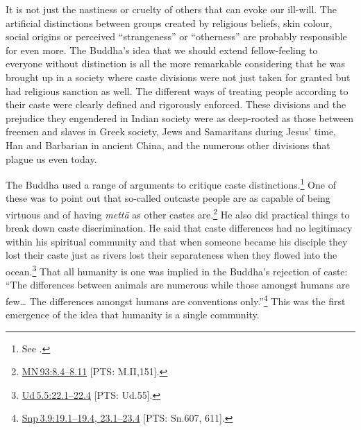 \documentclass[10pt, openright]{book}
\begin{document}
It is not just the nastiness or cruelty of others that can evoke our ill-will. The artificial distinctions between groups created by religious beliefs, skin colour, social origins or perceived “strangeness” or “otherness” are probably responsible for even more. The Buddha’s idea that we should extend fellow-feeling to everyone without distinction is all the more remarkable considering that he was brought up in a society where caste divisions were not just taken for granted but had religious sanction as well. The different ways of treating people according to their caste were clearly defined and rigorously enforced. These divisions and the prejudice they engendered in Indian society were as deep-rooted as those between freemen and slaves in Greek society, Jews and Samaritans during Jesus’ time, Han and Barbarian in ancient China, and the numerous other divisions that plague us even today.


The Buddha used a range of arguments to critique caste distinctions.\footnote {See \cite{Malalasekera and Jayatilleke 1974}.} One of these was to point out that so-called outcaste people are as capable of being virtuous and of having \textit{mettā} as other castes are.\footnote {\href{https://suttacentral.net/mn93/en/sujato\#8.4}{MN 93:8.4–8.11} [PTS: M.II,151].} He also did practical things to break down caste discrimination. He said that caste differences had no legitimacy within his spiritual community and that when someone became his disciple they lost their caste just as rivers lost their separateness when they flowed into the ocean.\footnote {\href{https://suttacentral.net/ud5.5/en/sujato\#22.1}{Ud 5.5:22.1–22.4} [PTS: Ud.55].} That all humanity is one was implied in the Buddha’s rejection of caste: “The differences between animals are numerous while those amongst humans are few… The differences amongst humans are conventions only.”\footnote {\href{https://suttacentral.net/snp3.9/en/sujato\#19.1}{Snp 3.9:19.1–19.4, 23.1–23.4} [PTS: Sn.607, 611].} This was the first emergence of the idea that humanity is a single community.
\end{document}
